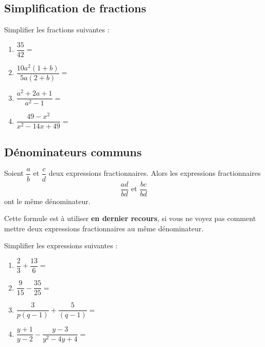 \documentclass{article}
\begin{document}
\subsection{Simplification de fractions}
\begin{example}
Simplifier les fractions suivantes :
\begin{enumerate}[label=\emph{\alph*})]
\item $\dfrac{35}{42} =$  \answersline
\item $\dfrac{10a^2(1 + b)}{5a(2 + b)} = $ \answersline
\item $\dfrac{a^2 + 2a + 1}{a^2 - 1} =$ \answersline
\item $\dfrac{49 - x^2}{x^2-14x+49} =$ \answersline
\end{enumerate}
\end{example}
\subsection{Dénominateurs communs}
\begin{proposition}
Soient $\dfrac{a}{b}$ et $\dfrac{c}{d}$ deux expressions fractionnaires. Alors les expressions fractionnaires
\begin{equation*}
\dfrac{ad}{bd} \text{ et } \dfrac{bc}{bd}    
\end{equation*}
ont le même dénominateur.
\end{proposition}
\begin{remark}
Cette formule est à utiliser \textbf{en dernier recours}, si vous ne voyez pas comment mettre deux expressions fractionnaires au même dénominateur.
\end{remark}
\begin{example}
Simplifier les expressions suivantes : 
\begin{enumerate}[label=\emph{\alph*)}]
\item $\dfrac{2}{3} + \dfrac{13}{6} =$ \answersline
\item $\dfrac{9}{15} - \dfrac{35}{25} = $
\answersline
\item $\dfrac{3}{p(q-1)} + \dfrac{5}{(q-1)} = $ \answersline 
\item $\dfrac{y + 1}{y - 2} - \dfrac{y - 3}{y^2 - 4y + 4} =$ \answersline
\end{enumerate}
\end{example}
\end{document}
